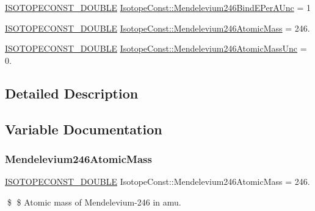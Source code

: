 \begin{DoxyCompactItemize}
\item 
\mbox{\hyperlink{group___isotope_const-_macros_ga8f45a7272ce02c0b4c65c44636ed719a}{I\+S\+O\+T\+O\+P\+E\+C\+O\+N\+S\+T\+\_\+\+D\+O\+U\+B\+LE}} \mbox{\hyperlink{group___isotope_const-_mendelevium-_md246_gad0cd5bd439849235094fecfabeed0aec}{Isotope\+Const\+::\+Mendelevium246\+Bind\+E\+Per\+A\+Unc}} = 1
\item 
\mbox{\hyperlink{group___isotope_const-_macros_ga8f45a7272ce02c0b4c65c44636ed719a}{I\+S\+O\+T\+O\+P\+E\+C\+O\+N\+S\+T\+\_\+\+D\+O\+U\+B\+LE}} \mbox{\hyperlink{group___isotope_const-_mendelevium-_md246_ga4a791c408f4d59ea9d5dbb418c436080}{Isotope\+Const\+::\+Mendelevium246\+Atomic\+Mass}} = 246.
\item 
\mbox{\hyperlink{group___isotope_const-_macros_ga8f45a7272ce02c0b4c65c44636ed719a}{I\+S\+O\+T\+O\+P\+E\+C\+O\+N\+S\+T\+\_\+\+D\+O\+U\+B\+LE}} \mbox{\hyperlink{group___isotope_const-_mendelevium-_md246_ga7674ff868cf3ef5a398b9a5c6be6f3b1}{Isotope\+Const\+::\+Mendelevium246\+Atomic\+Mass\+Unc}} = 0.
\end{DoxyCompactItemize}


\subsection{Detailed Description}


\subsection{Variable Documentation}
\mbox{\label{group___isotope_const-_mendelevium-_md246_ga4a791c408f4d59ea9d5dbb418c436080}} 
\subsubsection{\texorpdfstring{Mendelevium246\+Atomic\+Mass}{Mendelevium246AtomicMass}}
{\footnotesize\ttfamily \mbox{\hyperlink{group___isotope_const-_macros_ga8f45a7272ce02c0b4c65c44636ed719a}{I\+S\+O\+T\+O\+P\+E\+C\+O\+N\+S\+T\+\_\+\+D\+O\+U\+B\+LE}} Isotope\+Const\+::\+Mendelevium246\+Atomic\+Mass = 246.}

\$ \$ Atomic mass of Mendelevium-\/246 in amu. \mbox{\label{group___isotope_const-_mendelevium-_md246_ga7674ff868cf3ef5a398b9a5c6be6f3b1}} 

